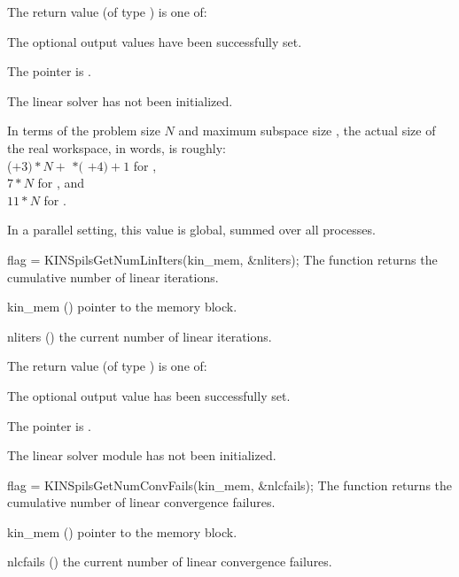 {
  The return value  (of type ) is one of:
  \begin{args}
  \item[\Id{KINSPILS\_SUCCESS}] 
    The optional output values have been successfully set.
  \item[\Id{KINSPILS\_MEM\_NULL}]
    The  pointer is .
  \item[\Id{KINSPILS\_LMEM\_NULL}]
    The {\kinspgmr} linear solver has not been initialized.
  \end{args}
}
{
  In terms of the problem size $N$ and maximum subspace size , 
  the actual size of the real workspace, in words, is roughly:\\
  ($+ 3)*N +$  $*($ $ + 4) + 1$ for {\kinspgmr},\\
  $7*N$  for {\kinspbcg}, and \\
  $11*N$ for {\kinsptfqmr}.

  In a parallel setting, this value is global, summed over all processes.
}
{
  flag = KINSpilsGetNumLinIters(kin\_mem, \&nliters);
}
{
  The function  returns the
  cumulative number of linear iterations.
}
{
  \begin{args}
  \item[kin\_mem] ()
    pointer to the {\kinsol} memory block.
  \item[nliters] ()
    the current number of linear iterations.
  \end{args}
}
{
  The return value  (of type ) is one of:
  \begin{args}
  \item[\Id{KINSPILS\_SUCCESS}] 
    The optional output value has been successfully set.
  \item[\Id{KINSPILS\_MEM\_NULL}]
    The  pointer is .
  \item[\Id{KINSPLIS\_LMEM\_NULL}]
    The linear solver module has not been initialized.
  \end{args}
}
{}
{
  flag = KINSpilsGetNumConvFails(kin\_mem, \&nlcfails);
}
{
  The function  returns the
  cumulative number of linear convergence failures.
}
{
  \begin{args}
  \item[kin\_mem] ()
    pointer to the {\kinsol} memory block.
  \item[nlcfails] ()
    the current number of linear convergence failures.
  \end{args}
}
